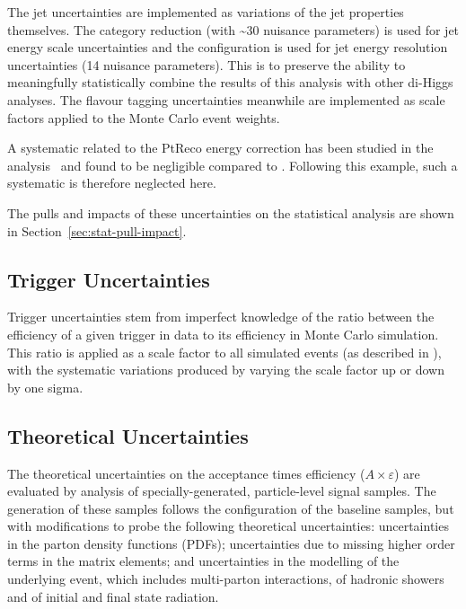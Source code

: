 The jet uncertainties are implemented as variations of the jet properties
themselves. The category reduction (with \textasciitilde 30 nuisance parameters)
is used for jet energy scale uncertainties and the  configuration
is used for jet energy resolution uncertainties (14 nuisance parameters). This
is to preserve the ability to meaningfully statistically combine the results of
this analysis with other di-Higgs analyses. The flavour tagging uncertainties
meanwhile are implemented as scale factors applied to the Monte Carlo event
weights.

A systematic related to the PtReco \bjet energy correction has been studied in the
\HepProcess{\higgs\higgs \to \gamma\gamma\Pqb\Paqb} analysis~\cite{bbyyNote} and found 
to be negligible compared to . Following this example, such a systematic is 
therefore neglected here.

The pulls and impacts of these uncertainties on the statistical analysis are shown
in Section~\ref{sec:stat-pull-impact}.

\FloatBarrier
\subsection{Trigger Uncertainties}
Trigger uncertainties stem from imperfect knowledge of the ratio between the
efficiency of a given trigger in data to its efficiency in Monte Carlo
simulation. This ratio is applied as a scale factor to all simulated events (as
described in \Sect{\ref{subsubsec:trig-sf}}), with the systematic variations
produced by varying the scale factor up or down by one sigma.


\subsection{Theoretical Uncertainties}
The theoretical uncertainties on the acceptance times efficiency ($A \times \varepsilon$) are
evaluated by analysis of specially-generated, particle-level signal samples. The
generation of these samples follows the configuration of the baseline samples,
but with modifications to probe the following theoretical uncertainties:
uncertainties in the parton density functions (PDFs); uncertainties due to
missing higher order terms in the matrix elements; and uncertainties in the
modelling of the underlying event, which includes multi-parton interactions, of
hadronic showers and of initial and final state radiation. 

